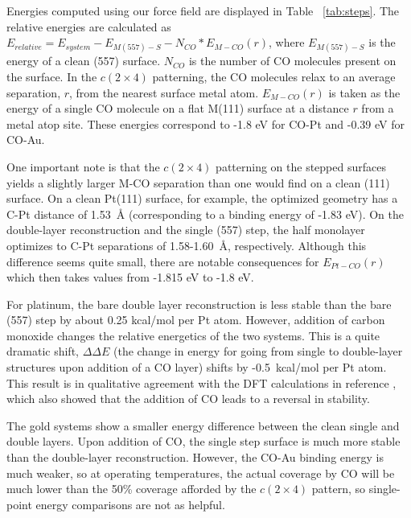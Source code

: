 Energies computed using our force field are displayed in Table
~\ref{tab:steps}.  The relative energies are calculated as
$E_{relative} = E_{system} - E_{M(557)-S} - N_{CO}*E_{M-CO}(r)$, where
$E_{M(557)-S}$ is the energy of a clean (557) surface. $N_{CO}$ is the
number of CO molecules present on the surface.  In the $c (2 \times
4)$ patterning, the CO molecules relax to an average separation, $r$,
from the nearest surface metal atom.  $E_{M-CO}(r)$ is taken as the
energy of a single CO molecule on a flat M(111) surface at a distance
$r$ from a metal atop site.  These energies correspond to -1.8 eV for
CO-Pt and -0.39 eV for CO-Au. 

One important note is that the $c (2 \times 4)$ patterning on the
stepped surfaces yields a slightly larger M-CO separation than one
would find on a clean (111) surface. On a clean Pt(111) surface, for
example, the optimized geometry has a C-Pt distance of 1.53~\AA
(corresponding to a binding energy of -1.83 eV).  On the double-layer
reconstruction and the single (557) step, the half monolayer optimizes
to C-Pt separations of 1.58-1.60~\AA, respectively.  Although this
difference seems quite small, there are notable consequences for
$E_{Pt-CO}(r)$ which then takes values from -1.815 eV to -1.8 eV.

For platinum, the bare double layer reconstruction is less stable than
the bare (557) step by about 0.25 kcal/mol per Pt atom. However,
addition of carbon monoxide changes the relative energetics of the two
systems. This is a quite dramatic shift, $\Delta\Delta E$ (the change
in energy for going from single to double-layer structures upon
addition of a CO layer) shifts by -0.5~kcal/mol per Pt atom. This
result is in qualitative agreement with the DFT calculations in
reference \citep{Tao:2010aa}, which
also showed that the addition of CO leads to a reversal in stability.

The gold systems show a smaller energy difference between the clean
single and double layers. Upon addition of CO, the single step surface
is much more stable than the double-layer reconstruction.  However,
the CO-Au binding energy is much weaker, so at operating temperatures,
the actual coverage by CO will be much lower than the 50\% coverage
afforded by the $c (2 \times 4)$ pattern, so single-point energy
comparisons are not as helpful.


